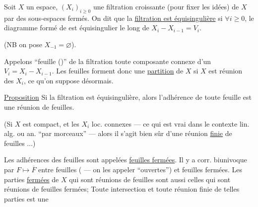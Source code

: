 Soit $X$ un espace, $(X_i)_{i\geq0}$ une filtration croissante (pour fixer les idées) de $X$ par des sous-espaces fermés. On dit que la \uline{filtration est équisingulière} si $\forall i\geq0$, le diagramme formé de
est équisingulier le long de $X_i-X_{i-1}=V_i$.

(NB on pose $X_{-1}=\varnothing$).

Appelons ``feuille ()'' de la filtration toute composante connexe d'un $V_i=X_i-X_{i-1}$.
Les feuilles  forment donc une \uline{partition} de $X$ si $X$ est réunion des $X_i$, ce qu'on suppose désormais.

\uline{Proposition} Si la  filtration est équisingulière, alors l'adhérence de toute feuille est une réunion de feuilles.

(Si $X$ est compact, et les $X_i$ loc. connexes --- ce qui est vrai dans le contexte lin.  alg. ou an. ``par morceaux'' --- alors il s'agit bien sûr d'une réunion \uline{finie} de feuilles $\ldots$)

Les adhérences des feuilles sont appelées \uline{feuilles fermées}. Il y a corr. biunivoque par $F\longmapsto\overline F$ entre feuilles ( --- on  les appeler ``ouvertes'') et feuilles fermées. Les parties \uline{fermées} de $X$ qui sont réunions de feuilles sont aussi celles qui sont réunions de feuilles fermées; Toute intersection et toute réunion finie de telles parties est une
